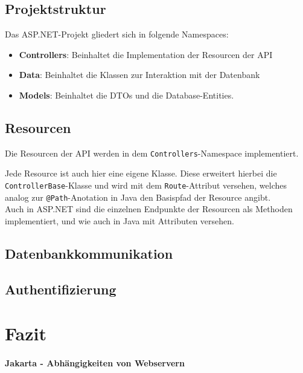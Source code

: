 \subsection{Projektstruktur}

Das ASP.NET-Projekt gliedert sich in folgende Namespaces:
\begin{itemize}
    \item \textbf{Controllers}: Beinhaltet die Implementation der Resourcen der API
    \item \textbf{Data}: Beinhaltet die Klassen zur Interaktion mit der Datenbank
    \item \textbf{Models}: Beinhaltet die \ac{DTO}s und die Database-Entities.
\end{itemize}

\subsection{Resourcen}

Die Resourcen der API werden in dem \texttt{Controllers}-Namespace implementiert.

Jede Resource ist auch hier eine eigene Klasse. Diese erweitert hierbei die \texttt{ControllerBase}-Klasse und wird mit dem \texttt{Route}-Attribut versehen, welches analog zur \texttt{@Path}-Anotation in Java den Basispfad der Resource angibt.\\

Auch in ASP.NET sind die einzelnen Endpunkte der Resourcen als Methoden implementiert, und wie auch in Java mit Attributen versehen.

\subsection{Datenbankkommunikation}

\subsection{Authentifizierung}


\section{Fazit}

\paragraph{Jakarta - Abhängigkeiten von Webservern}

